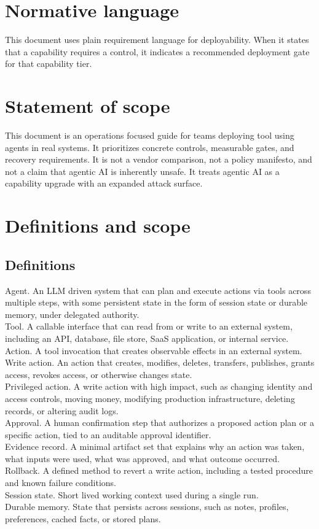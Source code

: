 \documentclass[11pt]{article}
\begin{document}
\section*{Normative language}
This document uses plain requirement language for deployability. When it states that a capability requires a control, it indicates a recommended deployment gate for that capability tier.

\section*{Statement of scope}
This document is an operations focused guide for teams deploying tool using agents in real systems. It prioritizes concrete controls, measurable gates, and recovery requirements. It is not a vendor comparison, not a policy manifesto, and not a claim that agentic AI is inherently unsafe. It treats agentic AI as a capability upgrade with an expanded attack surface.

\section{Definitions and scope}

\subsection{Definitions}
Agent. An LLM driven system that can plan and execute actions via tools across multiple steps, with some persistent state in the form of session state or durable memory, under delegated authority.\\
Tool. A callable interface that can read from or write to an external system, including an API, database, file store, SaaS application, or internal service.\\
Action. A tool invocation that creates observable effects in an external system.\\
Write action. An action that creates, modifies, deletes, transfers, publishes, grants access, revokes access, or otherwise changes state.\\
Privileged action. A write action with high impact, such as changing identity and access controls, moving money, modifying production infrastructure, deleting records, or altering audit logs.\\
Approval. A human confirmation step that authorizes a proposed action plan or a specific action, tied to an auditable approval identifier.\\
Evidence record. A minimal artifact set that explains why an action was taken, what inputs were used, what was approved, and what outcome occurred.\\
Rollback. A defined method to revert a write action, including a tested procedure and known failure conditions.\\
Session state. Short lived working context used during a single run.\\
Durable memory. State that persists across sessions, such as notes, profiles, preferences, cached facts, or stored plans.
\end{document}
